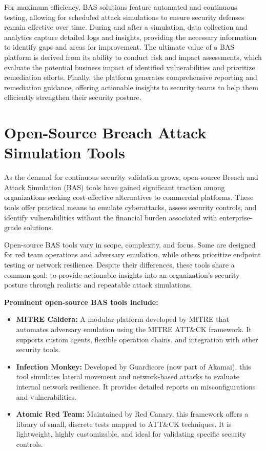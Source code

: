 For maximum efficiency, BAS solutions feature automated and continuous testing, allowing for scheduled attack simulations to ensure security defenses remain effective over time. During and after a simulation, data collection and analytics capture detailed logs and insights, providing the necessary information to identify gaps and areas for improvement. The ultimate value of a BAS platform is derived from its ability to conduct risk and impact assessments, which evaluate the potential business impact of identified vulnerabilities and prioritize remediation efforts. Finally, the platform generates comprehensive reporting and remediation guidance, offering actionable insights to security teams to help them efficiently strengthen their security posture.

\section{Open-Source Breach Attack Simulation Tools}\label{sec:Opensource_BAS}
As the demand for continuous security validation grows, open-source Breach and Attack Simulation (BAS) tools have gained significant traction among organizations seeking cost-effective alternatives to commercial platforms\cite{yuceel2025}. These tools offer practical means to emulate cyberattacks, assess security controls, and identify vulnerabilities without the financial burden associated with enterprise-grade solutions.

Open-source BAS tools vary in scope, complexity, and focus. Some are designed for red team operations and adversary emulation, while others prioritize endpoint testing or network resilience. Despite their differences, these tools share a common goal: to provide actionable insights into an organization’s security posture through realistic and repeatable attack simulations.

\textbf{Prominent open-source BAS tools include:}
\begin{itemize}
    \item \textbf{MITRE Caldera:} A modular platform developed by MITRE that automates adversary emulation using the MITRE ATT\&CK framework. It supports custom agents, flexible operation chains, and integration with other security tools\cite{caldera_docs}.
    \item \textbf{Infection Monkey:} Developed by Guardicore (now part of Akamai), this tool simulates lateral movement and network-based attacks to evaluate internal network resilience. It provides detailed reports on misconfigurations and vulnerabilities\cite{monkey_docs}.
    \item \textbf{Atomic Red Team:} Maintained by Red Canary, this framework offers a library of small, discrete tests mapped to ATT\&CK techniques. It is lightweight, highly customizable, and ideal for validating specific security controls\cite{atomic_docs}.
\end{itemize}

